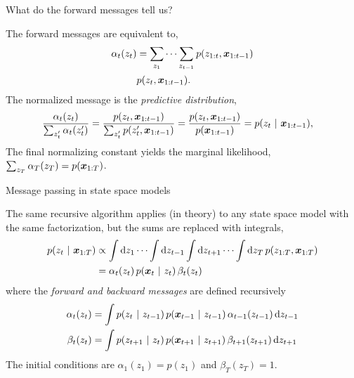 \documentclass[aspectratio=169]{beamer}
\begin{document}
\begin{frame}{What do the forward messages tell us?}
\label{slide:fwd_hmm}

The forward messages are equivalent to,
\begin{align}
    \alpha_t(z_t) &= \sum_{z_1} \cdots \sum_{z_{t-1}} p(z_{1:t}, \boldsymbol{x}_{1:t-1}) \\
    &p(z_t, \boldsymbol{x}_{1:t-1}).
\end{align}
The normalized message is the \textit{predictive distribution},
\begin{align}
    \frac{\alpha_t(z_t)}{\sum_{z_t'} \alpha_t(z_t')} &= 
    \frac{p(z_t, \boldsymbol{x}_{1:t-1})}{\sum_{z_t'} p(z_t', \boldsymbol{x}_{1:t-1})} = \frac{p(z_t, \boldsymbol{x}_{1:t-1})}{p(\boldsymbol{x}_{1:t-1})} = p(z_t ~\vert~ \boldsymbol{x}_{1:t-1}),
\end{align}
The final normalizing constant yields the marginal likelihood, $\sum_{z_T} \alpha_T(z_T) = p(\boldsymbol{x}_{1:T})$.


\end{frame}

\begin{frame}{Message passing in state space models}

The same recursive algorithm applies (in theory) to any state space model with the same factorization, but the sums are replaced with integrals,
\begin{align}
    p(z_t ~\vert~ \boldsymbol{x}_{1:T}) &\propto \int \mathop{}\!\mathrm{d} z_1 \cdots \int \mathop{}\!\mathrm{d} {z_{t-1}} \int \mathop{}\!\mathrm{d}{z_{t+1}} \cdots \int \mathop{}\!\mathrm{d} {z_T} \,  p(z_{1:T}, \boldsymbol{x}_{1:T}) \\
    &= \alpha_t(z_t) \, p(\boldsymbol{x}_t ~\vert~ z_t) \, \beta_t(z_t) 
\end{align}
where the \textit{forward and backward messages} are defined recursively
\begin{align}
    \alpha_t(z_t) &= \int p(z_t ~\vert~ z_{t-1}) \, p(\boldsymbol{x}_{t-1} ~\vert~ z_{t-1}) \, \alpha_{t-1}(z_{t-1}) \mathop{}\!\mathrm{d} {z_{t-1}} \\
    \beta_t(z_t) &= \int p(z_{t+1} ~\vert~ z_t) \, p(\boldsymbol{x}_{t+1} ~\vert~ z_{t+1}) \, \beta_{t+1}(z_{t+1}) \mathop{}\!\mathrm{d} {z_{t+1}} 
\end{align}
The initial conditions are $\alpha_1(z_1) = p(z_1)$ and $\beta_{T}(z_T) = 1$.
    
\end{frame}
\end{document}
